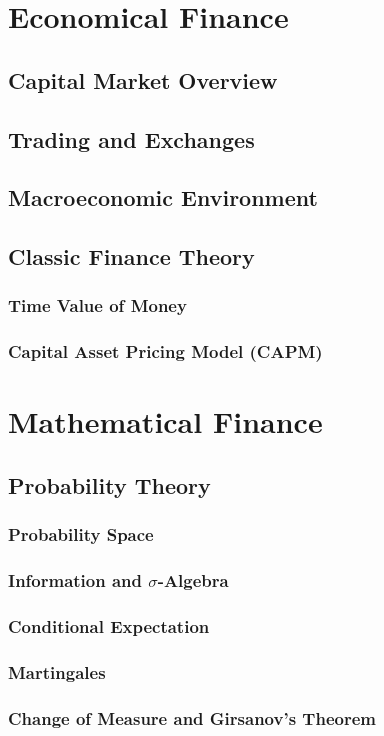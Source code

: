 \chapter{Economical Finance}
\section{Capital Market Overview}
\section{Trading and Exchanges}
\section{Macroeconomic Environment}
\section{Classic Finance Theory}
\subsection{Time Value of Money}
\subsection{Capital Asset Pricing Model (CAPM)}


\chapter{Mathematical Finance}
\section{Probability Theory}
\subsection{Probability Space}
\subsection{Information and $\sigma$-Algebra}
\subsection{Conditional Expectation}
\subsection{Martingales}
\subsection{Change of Measure and Girsanov's Theorem}

